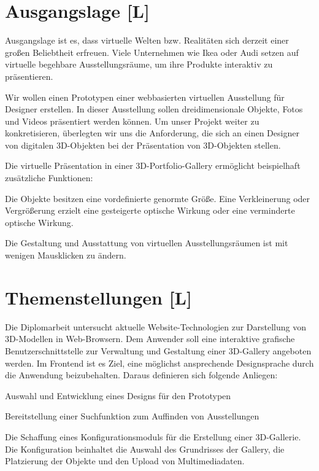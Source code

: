 \section{Ausgangslage [L]}
Ausgangslage ist es, dass virtuelle Welten bzw. Realitäten sich derzeit einer großen Beliebtheit erfreuen. Viele Unternehmen wie Ikea oder Audi setzen auf virtuelle begehbare Ausstellungsräume, um ihre Produkte interaktiv zu präsentieren. \cite{VrVW}

Wir wollen einen Prototypen einer webbasierten virtuellen Ausstellung für Designer erstellen. In dieser Ausstellung sollen dreidimensionale Objekte, Fotos und Videos präsentiert werden können. Um unser Projekt weiter zu konkretisieren, überlegten wir uns die Anforderung, die sich an einen Designer von digitalen 3D-Objekten bei der Präsentation von 3D-Objekten stellen.

Die virtuelle Präsentation in einer 3D-Portfolio-Gallery ermöglicht beispielhaft zusätzliche Funktionen:
\begin{compactitem}
    \item Die Objekte besitzen eine vordefinierte genormte Größe. Eine Verkleinerung oder Vergrößerung erzielt eine gesteigerte optische Wirkung oder eine verminderte optische Wirkung.
    \item Die Gestaltung und Ausstattung von virtuellen Ausstellungsräumen ist mit wenigen Mausklicken zu ändern.
\end{compactitem}


\section{Themenstellungen [L]}
Die Diplomarbeit untersucht aktuelle Website-Technologien zur Darstellung von 3D-Modellen in Web-Browsern.
Dem Anwender soll eine interaktive grafische Benutzerschnittstelle zur Verwaltung und Gestaltung einer 3D-Gallery angeboten werden.
Im Frontend ist es Ziel, eine möglichst ansprechende Designsprache durch die Anwendung beizubehalten.
Daraus definieren sich folgende Anliegen:
\begin{compactitem}
    \item Auswahl und Entwicklung eines Designs für den Prototypen
    \item Bereitstellung einer Suchfunktion zum Auffinden von Ausstellungen
    \item Die Schaffung eines Konfigurationsmoduls für die Erstellung einer 3D-Gallerie. Die Konfiguration beinhaltet die Auswahl des Grundrisses der Gallery, die Platzierung der Objekte und den Upload von Multimediadaten.
\end{compactitem}


